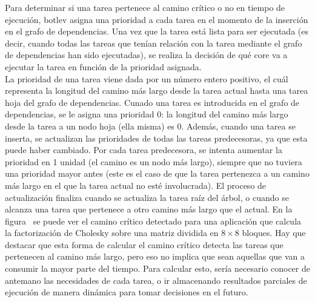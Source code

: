 Para determinar si una tarea pertenece al camino crítico o no en tiempo de
ejecución, botlev asigna una prioridad a cada tarea en el momento de la
inserción en el grafo de dependencias. Una vez que la tarea está lista para
ser ejecutada (es decir, cuando todas las tareas que tenían relación con la
tarea mediante el grafo de dependencias han sido ejecutadas), se realiza la
decisión de qué core va a ejecutar la tarea en función de la prioridad
asignada.\\
La prioridad de una tarea viene dada por un número entero positivo, el cuál
representa la longitud del camino más largo desde la tarea actual hasta una
tarea hoja del grafo de dependencias. Cunado una tarea es introducida en el
grafo de dependencias, se le asigna una prioridad 0: la longitud del camino
más largo desde la tarea a un nodo hoja (ella misma) es 0. Además, cuando
una tarea se inserta, se actualizan las prioridades de todas las tareas
predecesoras, ya que esta puede haber cambiado. Por cada tarea predecesora,
se intenta aumentar la prioridad en 1 unidad (el camino es un nodo más
largo), siempre que no tuviera una prioridad mayor antes (este es el caso
de que la tarea pertenezca a un camino más largo en el que la tarea actual
no esté involucrada). El proceso de actualización finaliza cuando se
actualiza la tarea raíz del árbol, o cuando se alcanza una tarea que
pertenece a otro camino más largo que el actual. En la figura~ se
puede ver el camino crítico detectado para una aplicación que calcula la
factorización de Cholesky sobre una matriz dividida en $8\times8$
bloques. Hay que destacar que esta forma de calcular el camino crítico
detecta las tareas que pertenecen al camino más largo, pero eso no implica
que sean aquellas que van a consumir la mayor parte del tiempo. Para
calcular esto, sería necesario conocer de antemano las necesidades de cada
tarea, o ir almacenando resultados parciales de ejecución de manera
dinámica para tomar decisiones en el futuro.

